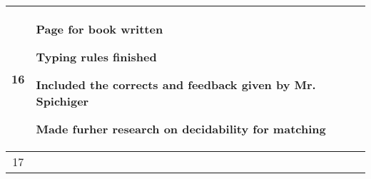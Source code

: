 \begin{center}
\begin{longtable}{|c|p{12cm}|}
16 &
\begin{journal}
	\item Page for book written
	\item Typing rules finished
	\item Included the corrects and feedback given by Mr. Spichiger
	\item Made furher research on decidability for matching
\end{journal}
\\ \hline
17 &
\begin{journal}
	\item
\end{journal}
\\ \hline
\end{longtable}
\end{center}

